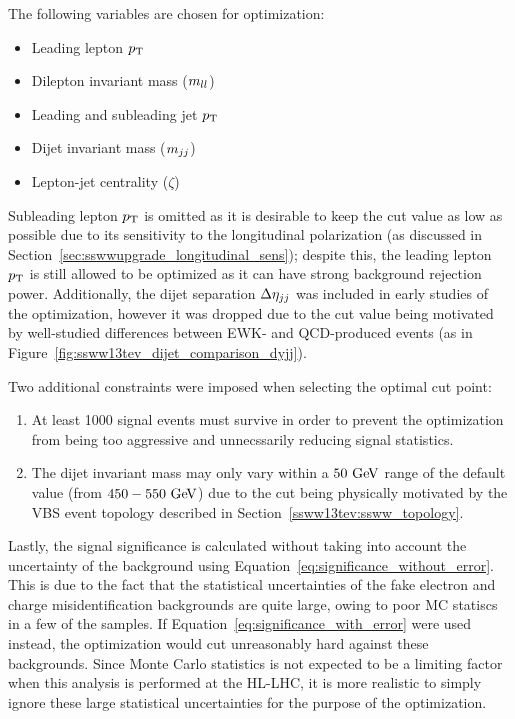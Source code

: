 The following variables are chosen for optimization:
\begin{itemize}
\item Leading lepton $p_{\mathrm{T}}$
\item Dilepton invariant mass ($m_{ll}$)
\item Leading and subleading jet $p_{\mathrm{T}}$
\item Dijet invariant mass ($m_{jj}$)
\item Lepton-jet centrality ($\zeta$)
\end{itemize}
Subleading lepton $p_{\mathrm{T}}$ is omitted as it is desirable to keep the cut value as low as possible due to its sensitivity to the longitudinal polarization (as discussed in Section~\ref{sec:sswwupgrade_longitudinal_sens}); despite this, the leading lepton $p_{\mathrm{T}}$ is still allowed to be optimized as it can have strong background rejection power.
Additionally, the dijet separation $\detajj$ was included in early studies of the optimization, however it was dropped due to the cut value being motivated by well-studied differences between EWK- and QCD-produced \ssww events (as in Figure~\ref{fig:ssww13tev_dijet_comparison_dyjj}).

Two additional constraints were imposed when selecting the optimal cut point:
\begin{enumerate}
\item At least 1000 signal events must survive in order to prevent the optimization from being too aggressive and unnecssarily reducing signal statistics.
\item The dijet invariant mass may only vary within a $50\gev$ range of the default value (from $450-550\gev$) due to the cut being physically motivated by the VBS event topology described in Section~\ref{ssww13tev:ssww_topology}.
\end{enumerate}

Lastly, the signal significance is calculated without taking into account the uncertainty of the background using Equation~\ref{eq:significance_without_error}.
This is due to the fact that the statistical uncertainties of the fake electron and charge misidentification backgrounds are quite large, owing to poor MC statiscs in a few of the samples.
If Equation~\ref{eq:significance_with_error} were used instead, the optimization would cut unreasonably hard against these backgrounds.
Since Monte Carlo statistics is not expected to be a limiting factor when this analysis is performed at the HL-LHC, it is more realistic to simply ignore these large statistical uncertainties for the purpose of the optimization.

